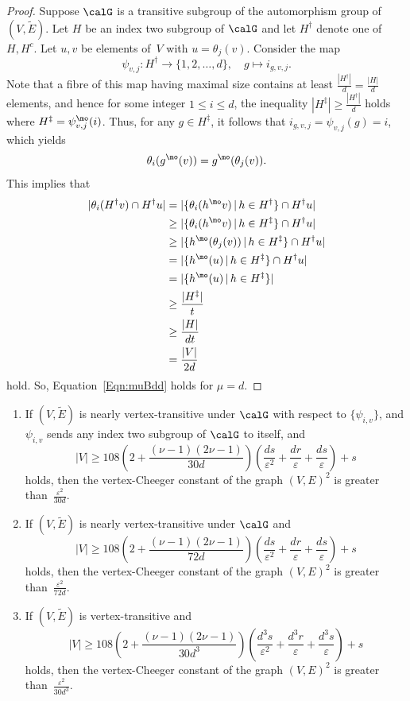 \begin{proof}
Suppose $\calG$ is a transitive subgroup of the automorphism group of $(V, \widetilde E)$. Let $H$ be an index two subgroup of $\calG$ and let $H^\dag$ denote one of $H, H^c$. Let $u,v$ be elements of~$V$ with $u = \theta_j(v)$. Consider the map 
$$\psi_{v, j} : H^\dag \to \{1, 2, \ldots, d\},\quad
g \mapsto i_{g, v, j}.$$
Note that a fibre of this map having maximal size contains at least $\frac {|H^\dag|}d = \frac{|H|}d$ elements, and hence for some integer $1\leq i \leq d$, the inequality $|H^\ddag  |\geq \frac {|H^\dag|}d$ holds where $H^\ddag = \psi_{v, j}^\mo(i)$. Thus, for any $g\in H^\ddag$, it follows that $i_{g, v, j} = \psi_{v, j}(g) = i$, which yields 
\[\theta_i(g^\mo(v)) = g^\mo (\theta_j (v)) .\]
This implies that 
\begin{align*}
|\theta_{i} (H^\dag v) \cap H^\dag u|
& = |\{\theta_{i}(h^\mo v) \,|\, h\in H^\dag\}\cap H^\dag u|\\
& \geq |\{\theta_{i}(h^\mo v) \,|\, h\in H^\ddag\}\cap H^\dag u|\\
& \geq |\{h^\mo (\theta_j(v)) \,|\, h\in H^\ddag\}\cap H^\dag u|\\
& = |\{h^\mo (u) \,|\, h\in H^\ddag\}\cap H^\dag u|\\
& = |\{h^\mo (u) \,|\, h\in H^\ddag\}|\\
& \geq \frac{|H^\ddag|}{t} \\
& \geq \frac{|H|}{dt}\\
& = \frac{|V|}{2d}
\end{align*}
hold. So, Equation~\eqref{Eqn:muBdd} holds for $\mu = d$. 
\end{proof}

\begin{theorem}\label{Thm:SpannSubgraVertexTra}
\quad
\begin{enumerate}
\item 
If $(V, \widetilde E)$ is nearly vertex-transitive under $\calG$ with respect to $\{\psi_{i,v}\}$, and $\psi_{i, v}$ sends any index two subgroup of $\calG$ to itself, and 
$$
|V| 
 \geq 
108
\left( 2 + \frac {(\nu-1)(2\nu -1)} {30d}  \right)  
\left( \frac{ds}{\varepsilon^2} + \frac{dr}\varepsilon +\frac{ds}{\varepsilon}\right) + s 
$$
holds, 
then the vertex-Cheeger constant of the graph $(V, E)^2$ is greater than~$\frac{\varepsilon^{2}}{30d}$. 

\item 
If $(V, \widetilde E)$ is nearly vertex-transitive under $\calG$ and 
$$
|V| 
 \geq 
108
\left( 2 + \frac {(\nu-1)(2\nu -1)}  {72d} \right)  
\left( \frac{ds}{\varepsilon^2} + \frac{dr}\varepsilon +\frac{ds}{\varepsilon}\right) + s 
$$
holds, then the vertex-Cheeger constant of the graph $(V, E)^2$ is greater than~$\frac{\varepsilon^{2}}{72d}$. 
\item 
If $(V, \widetilde E)$ is vertex-transitive and 
$$
|V| 
 \geq 
108
\left( 2 + \frac {(\nu-1)(2\nu -1)}  {30d^3} \right)  
\left( \frac{d^3s}{\varepsilon^2} + \frac{d^3r}\varepsilon+ \frac{d^{3}s}{\varepsilon}\right) + s
$$
holds, then the vertex-Cheeger constant of the graph $(V, E)^2$ is greater than~$ \frac{\varepsilon^{2}}{30d^3}$. 
\end{enumerate}
\end{theorem}

